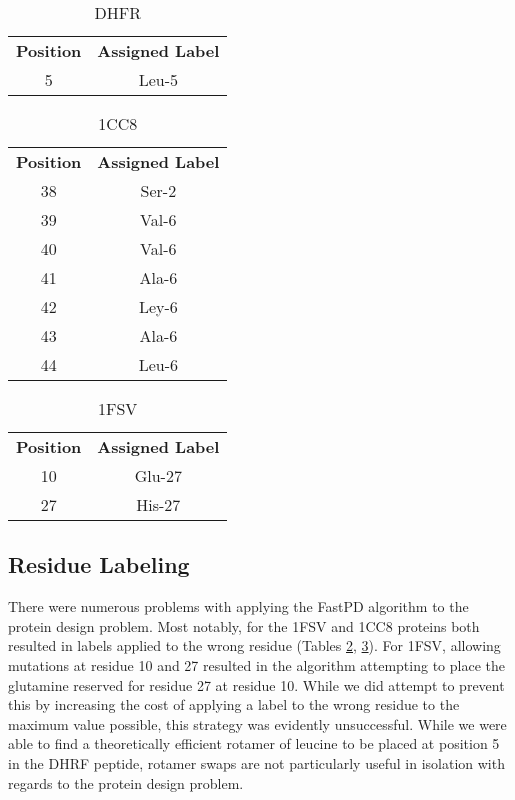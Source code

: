 \documentclass[11pt]{article}
\begin{document}
	
	\begin{table}[h]
	\centering
	\caption{DHFR}
	\label{dhfr}
	\begin{tabular}{@{}cc@{}}
	\toprule
	\textbf{Position} & \textbf{Assigned Label} \\
	5        & Leu-5          \\ \bottomrule
	\end{tabular}
	\end{table}
	\begin{table}[t]
	\centering
	\caption{1CC8}
	\label{1cc8}
	\begin{tabular}{@{}cc@{}}
	\toprule
	\textbf{Position} & \textbf{Assigned Label} \\
	38        & Ser-2          \\
	39        & Val-6          \\
	40        & Val-6          \\
	41        & Ala-6          \\
	42        & Ley-6          \\
	43        & Ala-6          \\
	44        & Leu-6          \\ \bottomrule
	\end{tabular}
	\end{table}
	\begin{table}[h]
	\centering
	\caption{1FSV}
	\begin{tabular}{@{}cc@{}}
	\toprule
	\textbf{Position} & \textbf{Assigned Label} \\
	10       & Glu-27         \\
	27       & His-27         \\ \bottomrule
	\end{tabular}
	\label{1fsv}
	\end{table}
	
	\subsection{Residue Labeling}	
	There were numerous problems with applying the FastPD algorithm to the protein
	design problem. Most notably, for the 1FSV and 1CC8 proteins both resulted in
	labels applied to the wrong residue (Tables \ref{1cc8}, \ref{1fsv}). For 1FSV,
	allowing mutations at residue 10 and 27 resulted in the algorithm attempting to
	place the glutamine reserved for residue 27 at residue 10. While we did attempt to
	prevent this by increasing the cost of applying a label to the wrong residue 
	to the maximum value possible, this strategy was evidently unsuccessful. While
	we were able to find a theoretically efficient rotamer of leucine to be placed
	at position 5 in the DHRF peptide, rotamer swaps are not particularly useful
	in isolation with regards to the protein design problem. 
	
\end{document}
